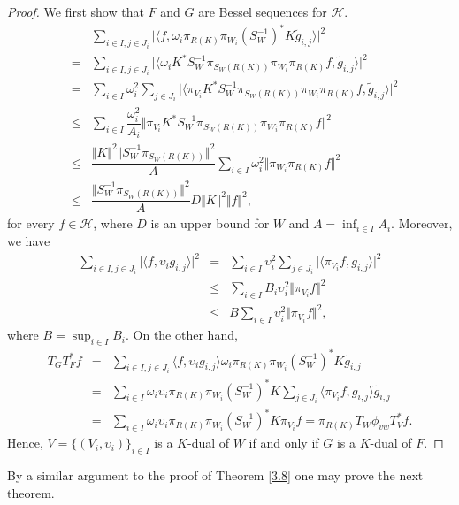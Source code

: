 \documentclass{birkjour}
\theoremstyle{definition}
\theoremstyle{remark}
\numberwithin{equation}{section}
\begin{document}
\begin{proof}  We first show that $F$ and $G$ are  Bessel sequences for $\mathcal{H}$.
 \begin{eqnarray*} &&\sum_{i\in I, j\in
J_{i}} \vert \langle f,
\omega_{i}\pi_{R(K)}\pi_{W_{i}}(S_{W}^{-1})^{*}K\widetilde{g}_{i,j} \rangle\vert^{2} \\
&=&
\sum_{i\in I, j\in J_{i}} \vert \langle
\omega_{i}K^{*}S_{W}^{-1}\pi_{S_{W}(R(K))}\pi_{W_{i}}\pi_{R(K)}f, \widetilde{g}_{i,j}\rangle\vert^{2}\\
&=&\sum_{i\in I}\omega_{i}^{2}\sum_{j\in J_{i}} \vert \langle
\pi_{V_{i}}K^{*}S_{W}^{-1}\pi_{S_{W}(R(K))}\pi_{W_{i}}\pi_{R(K)}f, \widetilde{g}_{i,j}\rangle\vert^{2}\\
&\leq& \sum_{i\in I} \dfrac{\omega_{i}^{2}}{A_{i}} \Vert
\pi_{V_{i}}K^{*}S_{W}^{-1}\pi_{S_{W}(R(K))}\pi_{W_{i}}\pi_{R(K)}f\Vert^{2}\\
&\leq& \dfrac{\Vert K\Vert^{2}\Vert S_{W}^{-1}\pi_{S_{W}(R(K))}\Vert^{2}}{A} \sum_{i\in I} \omega_{i}^{2}
\Vert \pi_{W_{i}}\pi_{R(K)}f\Vert^{2}\\
&\leq&  \dfrac{\Vert S_{W}^{-1}\pi_{S_{W}(R(K))}\Vert^{2}}{A} D\Vert K\Vert^{2} \Vert f\Vert^{2},\end{eqnarray*}
for every $f\in \mathcal{H}$, where $D$ is an upper bound for $W$ and $A = \inf_{i\in I}A_{i}$. Moreover, we have  \begin{eqnarray*}
\sum_{i\in I, j\in
J_{i}} \vert \langle f,
\upsilon_{i}g_{i,j}\rangle\vert^{2} &=& \sum_{i\in I}\upsilon_{i}^{2} \sum_{ j\in
J_{i}}\vert \langle \pi_{V_{i}}f,
g_{i,j}\rangle\vert^{2} \\
&\leq& \sum_{i\in I} B_{i} \upsilon_{i}^{2} \Vert \pi_{V_{i}}f\Vert^{2}\\
& \leq& B \sum_{i\in I}\upsilon_{i}^{2} \Vert \pi_{V_{i}}f\Vert^{2},
\end{eqnarray*}
where $ B = \sup_{i\in I}B_{i}$.
 On the other hand,
\begin{eqnarray*} T_{G}T_{F}^{*}f &=&   \sum_{i\in I, j\in J_{i}} \langle f, \upsilon_{i}g_{i,j}\rangle  \omega_{i} \pi_{R(K)}\pi_{W_{i}}(S_{W}^{-1})^{*}K\widetilde{g}_{i,j}\\
&=& \sum_{i\in I}
\omega_{i}\upsilon_{i} \pi_{R(K)}\pi_{W_{i}}(S_{W}^{-1})^{*}K \sum_{j\in J_{i}} \langle
\pi_{V_{i}}f,
g_{i,j}\rangle \widetilde{g}_{i,j}\\
&=&
 \sum_{i\in I}\omega_{i}\upsilon_{i} \pi_{R(K)}\pi_{W_{i}}(S_{W}^{-1})^{*}K\pi_{V_{i}}f = \pi_{R(K)}T_{W}\phi_{vw}T^{*}_{V}f.\end{eqnarray*}
Hence, $V=\lbrace(V_{i},\upsilon_{i})\rbrace_{i\in I}$ is a $K$-dual of
$W$ if and only if  $G$ is a $K$-dual of $F$.\end{proof}
By a similar argument to the proof of Theorem \ref{3.8} one may prove the next theorem.
\end{document}
